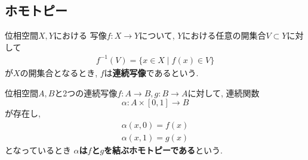 \begin{comment}
************************************


\begin{Def}
集合$X$の部分集合族$\mathcal{O}$について, 次が成り立つとき$\mathcal{O}$を{\bf 集合$X$の位相}という.
\begin{enumerate}
\item $X\in\mathcal{O}$,$\emptyset\in\mathcal{O}$
\item 任意の$U,V\in\mathcal{O}$について$U\cap V\in\mathcal{O}$である.
\item ...
\end{enumerate}
\end{Def}

************************************
\end{comment}
\subsection{ホモトピー}
\begin{Def}
位相空間$X,Y$における
写像$f:X\rightarrow Y$について,
$Y$における任意の開集合$V\subset Y$に対して
\begin{align*}
f^{-1}(V)=\{x\in X\mid f(x)\in V\}
\end{align*}
が$X$の開集合となるとき,
$f$は{\bf 連続写像}であるという.
\end{Def}
\begin{Def}
位相空間$A,B$と2つの連続写像$f:A\rightarrow B,g:B\rightarrow A$に対して, 連続関数
\[
\alpha : A\times [0,1]\rightarrow B
\]
が存在し,
\begin{align*}
\alpha(x,0)=f(x)\\
\alpha(x,1)=g(x)
\end{align*}
となっているとき
{\bf $\alpha$は$f$と$g$を結ぶホモトピーである}という.
\end{Def}


\begin{comment}
************************************
\begin{Def}
集合$X$に関して, 写像$d:X\times X\rightarrow \mathbb{R}$が以下の条件を満たすとき, {\bf $d$は$X$上の距離metricである}という.
\begin{enumerate}
\item 任意の$x,y\in X$について$d(x,y)=0\Leftrightarrow x=y$
\item 任意の$x,y\in X$について$d(x,y)=d(y,x)$
\item 任意の$x,y,z\in X$について$d(x,y)+d(y,z)\geq d(x,z)$
\end{enumerate}
\end{Def}
\begin{Def}
集合$X$と$X$上の距離$d$の組$(X,d)$を{\bf 距離空間 metric space}という
\end{Def}
\begin{Def}
集合$X$の部分集合$U\subset X$と$X$上の距離$d$について, 以下が成り立つとき, {\bf $U\subset X$は開集合である}という.

任意の$x\in U$に対して, とある実数$\epsilon > 0$が存在し, $d(x,y)<\epsilon$を満たす全ての$y\in X$が$y\in U$となる 
\end{Def}
************************************
\end{comment}